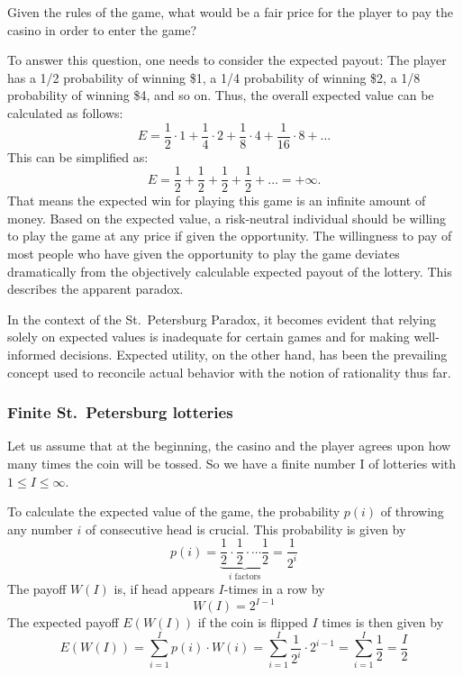 \documentclass[
  12pt,
  oneside]{book}
\theoremstyle{definition}
\theoremstyle{definition}
\theoremstyle{definition}
\theoremstyle{definition}
\theoremstyle{remark}
\begin{document}
Given the rules of the game, what would be a fair price for the player to pay the casino in order to enter the game?

To answer this question, one needs to consider the expected payout: The player has a 1/2 probability of winning \$1, a 1/4 probability of winning \$2, a 1/8 probability of winning \$4, and so on. Thus, the overall expected value can be calculated as follows:
\[
E = \frac{1}{2} \cdot 1 + \frac{1}{4} \cdot 2 + \frac{1}{8} \cdot 4+ \frac{1}{16} \cdot 8 + \dots 
\]
This can be simplified as:
\[
E = \frac{1}{2} + \frac{1}{2} + \frac{1}{2} + \frac{1}{2} + \dots = + \infty.
\]
That means the expected win for playing this game is an infinite amount of money. Based on the expected value, a risk-neutral individual should be willing to play the game at any price if given the opportunity.
The willingness to pay of most people who have given the opportunity to play the game deviates dramatically from the objectively calculable expected payout of the lottery. This describes the apparent paradox.

In the context of the St.~Petersburg Paradox, it becomes evident that relying solely on expected values is inadequate for certain games and for making well-informed decisions. Expected utility, on the other hand, has been the prevailing concept used to reconcile actual behavior with the notion of rationality thus far.

\hypertarget{finite-st.-petersburg-lotteries}{%
\subsubsection*{Finite St.~Petersburg lotteries}\label{finite-st.-petersburg-lotteries}}

Let us assume that at the beginning, the casino and the player agrees upon how many times the coin will be tossed. So we have a finite number I of lotteries with \(1 \leq I \leq \infty\).

To calculate the expected value of the game, the probability \(p(i)\) of throwing any number \(i\) of consecutive head is crucial. This probability is given by
\[
p(i)=\underbrace{\frac{1}{2} \cdot \frac{1}{2} \cdot \cdots \frac{1}{2}}_{i \text { factors}}=\frac{1}{2^{i}}
\]
The payoff \(W(I)\) is, if head appears \(I\)-times in a row by
\[
W(I)=2^{I-1}
\]
The expected payoff \(E(W(I))\) if the coin is flipped \(I\) times is then given by
\[
E(W(I))=\sum_{i=1}^{I} p(i) \cdot W(i)=\sum_{i=1}^{I} \frac{1}{2^{i}} \cdot 2^{i-1}=\sum_{i=1}^{I} \frac{1}{2}=\frac{I}{2}
\]
\end{document}
